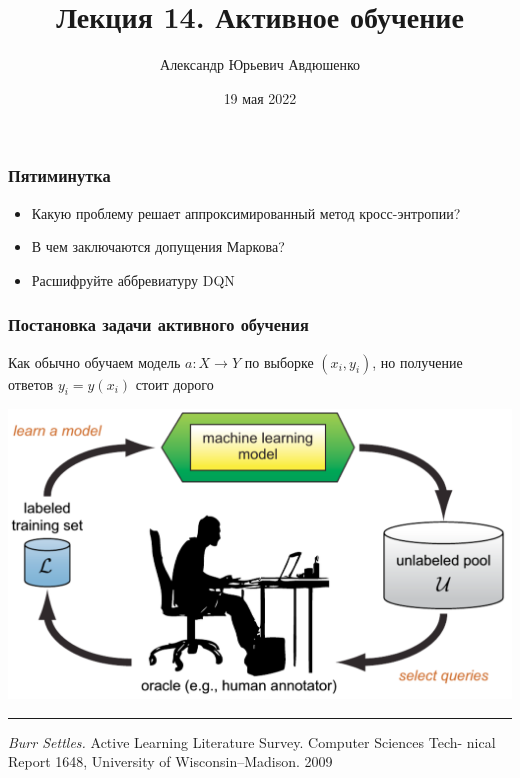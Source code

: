 \documentclass[fullscreen=true, bookmarks=true, hyperref={pdfencoding=unicode}]{beamer}
\title{Лекция 14. Активное обучение}
\author{Александр Юрьевич Авдюшенко}
\institute{МКН СПбГУ}
\date{19 мая 2022}
\begin{document}

\begin{frame}
\transdissolve[duration=0.2]
\titlepage
\end{frame}


\begin{frame}
  \frametitle{Пятиминутка}
  \begin{itemize}
    \item Какую проблему решает аппроксимированный метод кросс-энтропии?
    \item В чем заключаются допущения Маркова?
    \item Расшифруйте аббревиатуру DQN
  \end{itemize}
\end{frame}


\begin{frame}
  \frametitle{Постановка задачи активного обучения}

  Как обычно обучаем модель $a: X \to Y$ по выборке $(x_i, y_i)$, но получение ответов $y_i = y(x_i)$ стоит дорого

  \begin{center}
    \includegraphics[keepaspectratio,
                     width=.7\paperwidth]{active_learning_scheme.png}
  \end{center}

  \noindent\rule{8cm}{0.4pt}

  {\small
  {\it Burr Settles.} Active Learning Literature Survey. Computer Sciences Tech-
  nical Report 1648, University of Wisconsin–Madison. 2009}
\end{frame}
\end{document}

